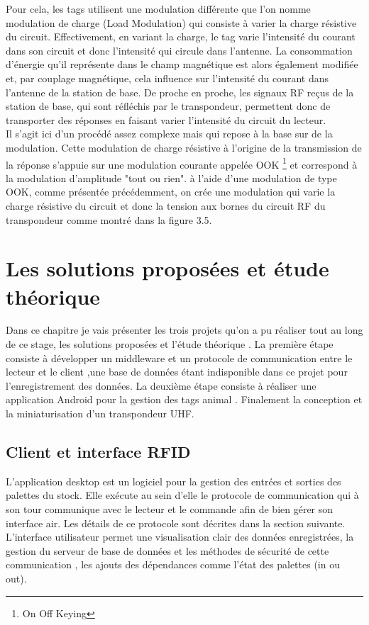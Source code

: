 \documentclass[11pt, a4paper, twoside]{book}
\begin{document}
Pour cela, les tags utilisent une modulation différente que l'on nomme modulation de charge (Load Modulation) qui consiste à varier la charge résistive du circuit. Effectivement, en variant la charge, le tag varie l'intensité du courant dans son circuit et donc l'intensité qui circule dans l'antenne. La consommation d'énergie qu'il représente dans le champ magnétique est alors également modifiée et, par couplage magnétique, cela influence sur l'intensité du courant dans l'antenne de la station de base. De proche en proche, les signaux RF reçus de la station de base, qui sont réfléchis par le transpondeur, permettent donc de transporter des réponses en faisant varier l'intensité du circuit du lecteur.\\

Il s'agit ici d'un procédé assez complexe mais qui repose à la base sur de la modulation. Cette modulation de charge résistive à l'origine de la transmission de la réponse s'appuie sur une modulation courante appelée OOK \footnote{On Off Keying} et correspond à la modulation d'amplitude "tout ou rien". à l'aide d'une modulation de type OOK, comme présentée précédemment, on crée une modulation qui varie la charge résistive du circuit et donc la tension aux bornes du circuit RF du transpondeur comme montré dans la figure 3.5.\\
\chapter{Les solutions proposées et étude théorique }
Dans ce chapitre je vais présenter les trois projets qu'on a pu réaliser tout au long de ce stage, les solutions proposées et l'étude théorique . La première étape consiste à développer un middleware et un protocole de communication entre le lecteur et le client ,une base de données étant indisponible dans ce projet pour l'enregistrement des données. La deuxième étape consiste à réaliser une application Android pour la gestion des tags animal . Finalement la conception et la miniaturisation d'un transpondeur UHF.
\section{Client et interface RFID}

L'application desktop  est un logiciel pour la gestion des entrées et sorties des palettes du stock. Elle exécute au sein d'elle le protocole de communication qui à son tour communique avec le lecteur et le commande afin de bien gérer son interface air. Les détails de ce protocole sont décrites dans la section suivante. L'interface utilisateur permet une visualisation clair des données enregistrées, la gestion du serveur de base de données et les méthodes de sécurité de cette communication , les ajouts des dépendances comme l'état des palettes (in ou out).\\
\end{document}
